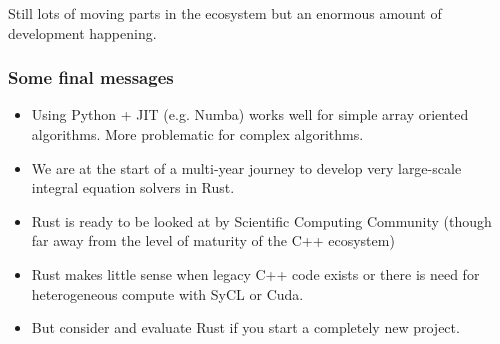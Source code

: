 \documentclass[dvipsnames,10pt]{beamer}
\begin{document}
\begin{frame}
{\begin{tabular}{cc}
\end{tabular}

}

\vspace{\baselineskip}

\begin{tcolorbox}
Still lots of moving parts in the ecosystem but an enormous amount of development happening.
\end{tcolorbox}

\end{frame}


\begin{frame}
\frametitle{Some final messages}
\begin{itemize}
\item Using Python + JIT (e.g. Numba) works well for simple array oriented algorithms. More problematic for complex algorithms.
\item We are at the start of a multi-year journey to develop very large-scale integral equation solvers in Rust.
\item Rust is ready to be looked at by Scientific Computing Community (though far away from the level of maturity of the C++ ecosystem)
\item Rust makes little sense when legacy C++ code exists or there is need for heterogeneous compute with SyCL or Cuda.
\item But consider and evaluate Rust if you start a completely new project.
\end{itemize}
\end{frame}
\end{document}
